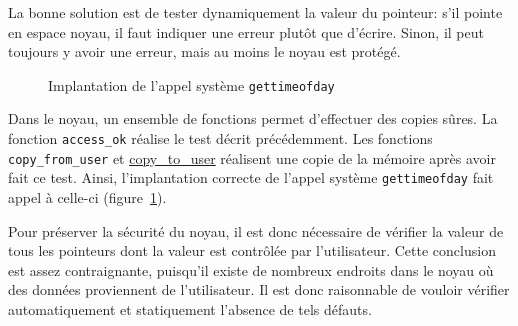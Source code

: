 La bonne solution est de tester dynamiquement la valeur du pointeur: s'il pointe
en espace noyau, il faut indiquer une erreur plutôt que d'écrire. Sinon, il peut
toujours y avoir une erreur, mais au moins le noyau est protégé.

\begin{figure}
\caption{Implantation de l'appel système \texttt{gettimeofday}}
\label{fig:implem-gettime}
\end{figure}

Dans le noyau, un ensemble de fonctions permet d'effectuer des copies sûres. La
fonction \texttt{access\_ok} réalise le test décrit précédemment. Les fonctions
\texttt{copy\_from\_user} et \url{copy_to_user} réalisent une copie de la
mémoire après avoir fait ce test. Ainsi, l'implantation correcte de l'appel
système \texttt{gettimeofday} fait appel à celle-ci
(figure~\ref{fig:implem-gettime}).

Pour préserver la sécurité du noyau, il est donc nécessaire de vérifier la
valeur de tous les pointeurs dont la valeur est contrôlée par l'utilisateur.
Cette conclusion est assez contraignante, puisqu'il existe de nombreux endroits
dans le noyau où des données proviennent de l'utilisateur. Il est donc
raisonnable de vouloir vérifier automatiquement et statiquement l'absence de
tels défauts.







